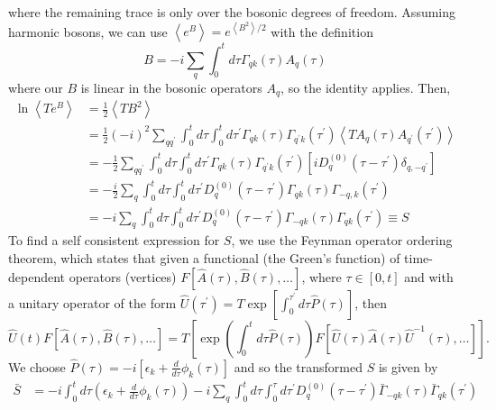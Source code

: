  where the remaining trace is only over the bosonic degrees of freedom. Assuming harmonic bosons, we can use $\left\langle e^B \right\rangle = e^{\left\langle B^2\right\rangle / 2}$ with the definition
\begin{equation}
    B=-i \sum_q \int_0^t d \tau \Gamma_{q k}(\tau) A_q(\tau)
\end{equation}
where our $B$ is linear in the bosonic operators $A_q$, so the identity applies. Then, 
\begin{align}
    \ln \left\langle T e^B\right\rangle & =\frac{1}{2}\left\langle T B^2\right\rangle \\
& =\frac{1}{2}(-i)^2 \sum_{q q^{\prime}} \int_0^t d \tau \int_0^t d \tau^{\prime} \Gamma_{q k}(\tau) \Gamma_{q^{\prime} k}\left(\tau^{\prime}\right)\left\langle T A_q(\tau) A_{q^{\prime}}\left(\tau^{\prime}\right)\right\rangle \\
& =-\frac{1}{2} \sum_{q q^{\prime}} \int_0^t d \tau \int_0^t d \tau^{\prime} \Gamma_{q k}(\tau) \Gamma_{q^{\prime} k}\left(\tau^{\prime}\right)\left[i D_q^{(0)}\left(\tau-\tau^{\prime}\right) \delta_{q,-q^{\prime}}\right] \\
& =-\frac{i}{2} \sum_q \int_0^t d \tau \int_0^t d \tau^{\prime} D_q^{(0)}\left(\tau-\tau^{\prime}\right) \Gamma_{q k}(\tau) \Gamma_{-q, k}\left(\tau^{\prime}\right) \\
& = -i \sum_q \int_0^t d \tau \int_0^t d \tau^{\prime} D_q^{(0)}\left(\tau-\tau^{\prime}\right) \Gamma_{-q k}(\tau) \Gamma_{q k}\left(\tau^{\prime}\right) \equiv S
\end{align}
To find a self consistent expression for $S$, we use the Feynman operator ordering theorem, which states that given a functional (the Green's function) of time-dependent operators (vertices) $F[\hat{A}(\tau), \hat{B}(\tau), \ldots]$,  where $\tau \in[0, t]$ and with a unitary operator of the form $\hat{U}\left(\tau^{\prime}\right)=T \exp \left[\int_0^{\tau^{\prime}} d \tau \hat{P}(\tau)\right]$, then
\begin{equation}
\hat{U}(t) F[\hat{A}(\tau), \hat{B}(\tau), \ldots] =T\left[\exp \left(\int_0^t d \tau \hat{P}(\tau)\right) F\left[\hat{U}(\tau) \hat{A}(\tau) \hat{U}^{-1}(\tau), \ldots\right]\right] .
\end{equation}
We choose $\hat{P}(\tau)=-i\left[\epsilon_k+\frac{d}{d \tau} \phi_k(\tau)\right]$ and
so the transformed $S$ is given by
\begin{align}
    \bar{S}
&= -i \int_0^t d \tau\left(\epsilon_k+\frac{d}{d \tau} \phi_k(\tau)\right) -i \sum_q \int_0^t d \tau \int_0^\tau d \tau^{\prime} D_q^{(0)}\left(\tau-\tau^{\prime}\right) \bar{\Gamma}_{-q k}(\tau) \bar{\Gamma}_{q k}\left(\tau^{\prime}\right)
\end{align}
